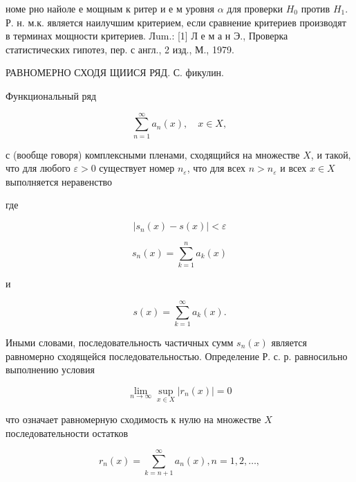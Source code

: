 \documentclass[10pt]{article}
\begin{document}
номе рно найоле е мощным к ритер и е м уровня $\alpha$ для проверки $H_{0}$ против $H_{1}$. Р. н. м.к. является наилучшим критерием, если сравнение критериев производят в терминах мощности критериев. Лum.: [1] Л е м а н Э., Проверка статистических гипотез, пер. с англ., 2 изд., М., 1979.

РАВНОМЕРНО СХОДЯ ЩИИСЯ РЯД. С. фикулин.

Функциональный ряд



\[

\sum_{n=1}^{\infty} a_{n}(x), \quad x \in X,

\]



с (вообще говоря) комплексными пленами, сходящийся на множестве $X$, и такой, что для любого $\varepsilon>0$ существует номер $n_{\varepsilon}$, что для всех $n>n_{\varepsilon}$ и всех $x \in X$ выполняется неравенство



где



\[

\left|s_{n}(x)-s(x)\right|<\varepsilon

\]



\[

s_{n}(x)=\sum_{k=1}^{n} a_{k}(x)

\]



и



\[

s(x)=\sum_{k=1}^{\infty} a_{k}(x) .

\]



Иными словами, последовательность частичных сумм $s_{n}(x)$ является равномерно сходящейся последовательностью. Определение Р. с. р. равносильно выполнению условия



\[

\lim _{n \rightarrow \infty} \sup _{x \in X}\left|r_{n}(x)\right|=0

\]



что означает равномерную сходимость к нулю на множестве $X$ последовательности остатков



\[

r_{n}(x)=\sum_{k=n+1}^{\infty} a_{n}(x), n=1,2, \ldots,

\]
\end{document}
